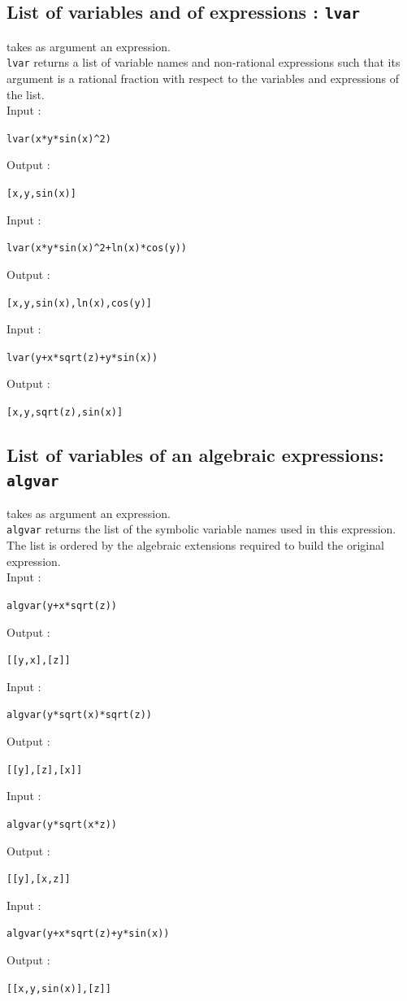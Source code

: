 \documentclass[a4paper,11pt]{book}
\begin{document}
\subsection{List of variables and of expressions : {\tt lvar}}\label{sec:lvar}
 takes as argument an expression.\\
{\tt lvar}  returns a list of variable names and non-rational
expressions such that its argument is a rational fraction
with respect to the variables and expressions of the list.\\
Input :
\begin{center}{\tt lvar(x*y*sin(x)\verb|^|2)}\end{center}
Output :
\begin{center}{\tt [x,y,sin(x)]}\end{center}
Input :
\begin{center}{\tt lvar(x*y*sin(x)\verb|^|2+ln(x)*cos(y))}\end{center}
Output :
\begin{center}{\tt [x,y,sin(x),ln(x),cos(y)]}\end{center}
Input :
\begin{center}{\tt lvar(y+x*sqrt(z)+y*sin(x))}\end{center}
Output :
\begin{center}{\tt [x,y,sqrt(z),sin(x)]}\end{center}

\subsection{List of variables of an algebraic expressions: {\tt algvar}}
 takes as argument an expression.\\ 
{\tt algvar} returns the list of the symbolic
variable names used in this expression. The list is ordered
by the algebraic extensions required to build the original expression.\\
Input :
\begin{center}{\tt algvar(y+x*sqrt(z))}\end{center}
Output :
\begin{center}{\tt  [[y,x],[z]]}\end{center}
Input :
\begin{center}{\tt algvar(y*sqrt(x)*sqrt(z))}\end{center}
Output :
\begin{center}{\tt  [[y],[z],[x]]}\end{center}
Input :
\begin{center}{\tt algvar(y*sqrt(x*z))}\end{center}
Output :
\begin{center}{\tt  [[y],[x,z]]}\end{center}
Input :
\begin{center}{\tt algvar(y+x*sqrt(z)+y*sin(x))}\end{center}
Output :
\begin{center}{\tt [[x,y,sin(x)],[z]]}\end{center}
\end{document}
